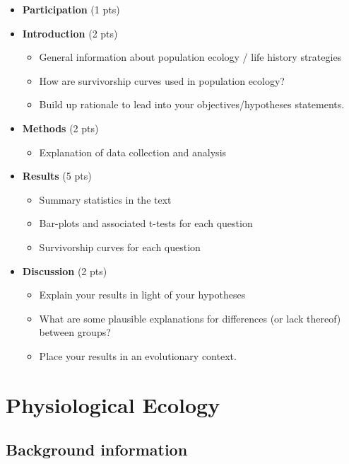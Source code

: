 \documentclass[]{book}
\providecommand{\tightlist}{%
  \setlength{\itemsep}{0pt}\setlength{\parskip}{0pt}}
\theoremstyle{definition}
\theoremstyle{definition}
\theoremstyle{definition}
\theoremstyle{remark}
\begin{document}
\begin{itemize}
\item
  \textbf{Participation} (1 pts)
\item
  \textbf{Introduction} (2 pts)

  \begin{itemize}
  \tightlist
  \item
    General information about population ecology / life history
    strategies
  \item
    How are survivorship curves used in population ecology?
  \item
    Build up rationale to lead into your objectives/hypotheses
    statements.
  \end{itemize}
\item
  \textbf{Methods} (2 pts)

  \begin{itemize}
  \tightlist
  \item
    Explanation of data collection and analysis
  \end{itemize}
\item
  \textbf{Results} (5 pts)

  \begin{itemize}
  \tightlist
  \item
    Summary statistics in the text
  \item
    Bar-plots and associated t-tests for each question
  \item
    Survivorship curves for each question
  \end{itemize}
\item
  \textbf{Discussion} (2 pts)

  \begin{itemize}
  \tightlist
  \item
    Explain your results in light of your hypotheses
  \item
    What are some plausible explanations for differences (or lack
    thereof) between groups?
  \item
    Place your results in an evolutionary context.
  \end{itemize}
\end{itemize}

\chapter{Physiological Ecology}\label{physiological-ecology}

\section{Background information}\label{background-information-1}
\end{document}
